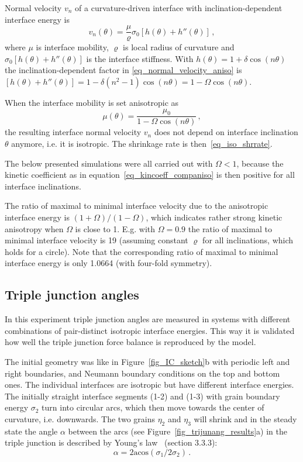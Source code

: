 Normal velocity $v_n$ of a curvature-driven interface with inclination-dependent interface energy is~\cite{Abdeljawad2018}
\begin{equation}\label{eq_normal_velocity_aniso}
	v_n(\theta) = \frac{\mu}{\varrho}  \sigma_0[h(\theta)+h''(\theta)]\,,
\end{equation}
where $\mu$ is interface mobility, $\varrho$ is local radius of curvature and $\sigma_0[h(\theta)+h''(\theta)]$ is the interface stiffness. With $h(\theta)=1+\delta\cos(n\theta)$ the inclination-dependent factor in \eqref{eq_normal_velocity_aniso} is $[h(\theta)+h''(\theta)] = 1 - \delta(n^2-1)\cos(n\theta) = 1-\Omega\cos(n\theta)$.

When the interface mobility is set anisotropic as
\begin{equation} \label{eq_kincoeff_companiso}
	\mu(\theta) = \frac{\mu_0}{1-\Omega\cos(n\theta)} \,,
\end{equation}
the resulting interface normal velocity $v_n$ does not depend on interface inclination $\theta$ anymore, i.e. it is isotropic. The shrinkage rate is then~\eqref{eq_iso_shrrate}.

The below presented simulations were all carried out with $\Omega<1$, because the kinetic coefficient as in equation~\eqref{eq_kincoeff_companiso} is then positive for all interface inclinations. 

The ratio of maximal to minimal interface velocity due to the anisotropic interface energy is $(1+\Omega)/(1-\Omega)$, which indicates rather strong kinetic anisotropy when $\Omega$ is close to 1. E.g. with $\Omega=0.9$ the ratio of maximal to minimal interface velocity is 19 (assuming constant $\varrho$ for all inclinations, which holds for a circle). Note that the corresponding ratio of maximal to minimal interface energy is only 1.0664 (with four-fold symmetry).

\subsection{Triple junction angles}

In this experiment triple junction angles are measured in systems with different combinations of pair-distinct isotropic interface energies. This way it is validated how well the triple junction force balance is reproduced by the model.

The initial geometry was like in Figure~\ref{fig_IC_sketch}b with periodic left and right boundaries, and Neumann boundary conditions on the top and bottom ones. The individual interfaces are isotropic but have different interface energies. The initially straight interface segments (1-2) and (1-3) with grain boundary energy $\sigma_2$ turn into circular arcs, which then move towards the center of curvature, i.e. downwards. The two grains $\eta_2$ and $\eta_3$ will shrink and in the steady state the angle $\alpha$ between the arcs (see Figure~\ref{fig_trijunang_results}a) in the triple junction is described by Young's law~\cite{Porter2009} (section 3.3.3):
\begin{equation}
	\alpha = 2\mathrm{acos}(\sigma_{1}/2\sigma_{2}) \,.
\end{equation}

